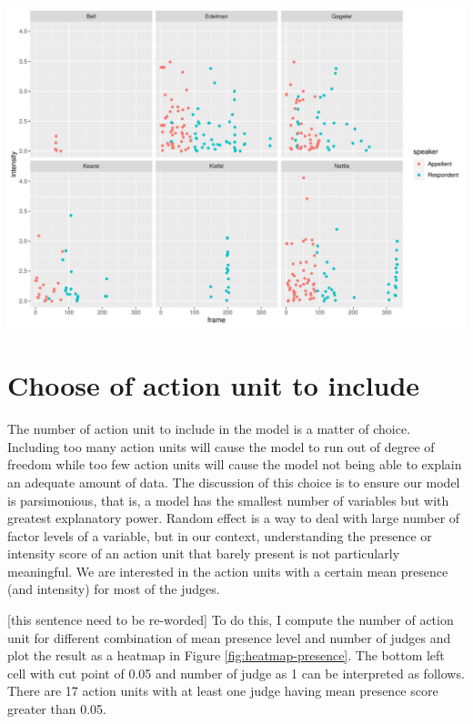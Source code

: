 \documentclass{monashthesis}
\begin{document}
\begin{center}\includegraphics[width=1\linewidth]{figures/high-intensity-points-1} \end{center}

\newpage

\hypertarget{choose-of-action-unit-to-include}{%
\section{Choose of action unit to include}\label{choose-of-action-unit-to-include}}

The number of action unit to include in the model is a matter of choice. Including too many action units will cause the model to run out of degree of freedom while too few action units will cause the model not being able to explain an adequate amount of data. The discussion of this choice is to ensure our model is parsimonious, that is, a model has the smallest number of variables but with greatest explanatory power. Random effect is a way to deal with large number of factor levels of a variable, but in our context, understanding the presence or intensity score of an action unit that barely present is not particularly meaningful. We are interested in the action units with a certain mean presence (and intensity) for most of the judges.

{[}this sentence need to be re-worded{]} To do this, I compute the number of action unit for different combination of mean presence level and number of judges and plot the result as a heatmap in Figure \ref{fig:heatmap-presence}. The bottom left cell with cut point of 0.05 and number of judge as 1 can be interpreted as follows. There are 17 action units with at least one judge having mean presence score greater than 0.05.
\end{document}
